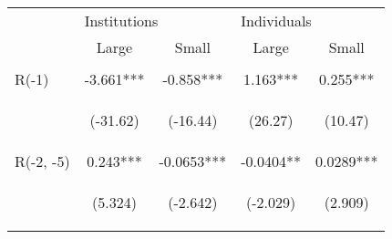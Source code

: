 \documentclass[border=0.2cm]{standalone}
\begin{document}
\begin{tabular}{lcccc}
                           & \multicolumn{2}{l}{Institutions}               & \multicolumn{2}{l}{Individuals}                                                                                                                  \\
    \cmidrule(l){2-3} \cmidrule(l){4-5}
    \vspace{4pt}           & Large                                          & Small                                          & Large                                          & Small                                          \\
    \toprule
    \vspace{4pt}           & \begin{footnotesize}\end{footnotesize}         & \begin{footnotesize}\end{footnotesize}         & \begin{footnotesize}\end{footnotesize}         & \begin{footnotesize}\end{footnotesize}         \\
    R(-1)                  & -3.661***                                      & -0.858***                                      & 1.163***                                       & 0.255***                                       \\
    \vspace{4pt}           & \begin{footnotesize}(-31.62)\end{footnotesize} & \begin{footnotesize}(-16.44)\end{footnotesize} & \begin{footnotesize}(26.27)\end{footnotesize}  & \begin{footnotesize}(10.47)\end{footnotesize}  \\
    R(-2, -5)              & 0.243***                                       & -0.0653***                                     & -0.0404**                                      & 0.0289***                                      \\
    \vspace{4pt}           & \begin{footnotesize}(5.324)\end{footnotesize}  & \begin{footnotesize}(-2.642)\end{footnotesize} & \begin{footnotesize}(-2.029)\end{footnotesize} & \begin{footnotesize}(2.909)\end{footnotesize}  \\

\end{tabular}
\end{document}
